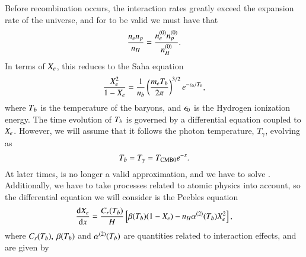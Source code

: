 Before recombination occurs, the interaction rates greatly exceed the expansion rate of the universe, and for  to be valid we must have that 
\begin{equation} \label{eq:M2:theory:Boltzmann_equation_recombination_approximation}
    \frac{n_e n_p}{n_H} = \frac{\equilibriumn[e]\equilibriumn[p]}{\equilibriumn[H]}.
\end{equation}
In terms of $\Xe$, this reduces to the Saha equation 
\begin{equation} \label{eq:M2:theory:saha_equation}
    \frac{\Xe^2}{1-\Xe} = \frac{1}{n_b} \pclosed{\frac{m_e \Tb}{2\pi}}^{3/2} e^{-\epsn / \Tb},
\end{equation}
where $\Tb$ is the temperature of the baryons, and $\epsn$ is the Hydrogen ionization energy. The time evolution of $\Tb$ is governed by a differential equation coupled to $\Xe$. However, we will assume that it follows the photon temperature, $T_\gamma$, evolving as  
\begin{equation} \label{eq:M2:theory:baryon_temperature_evolution}
    \Tb = T_\gamma = \tcmb e^{-x}.
\end{equation}
At later times,  is no longer a valid approximation, and we have to solve . Additionally, we have to take processes related to atomic physics into account, so the differential equation we will consider is the Peebles equation  
\begin{equation} \label{eq:M2:theory:Xe_peebles_ODE}
    \dv{\Xe}{x} = \frac{C_r(\Tb)}{H}\bclosed{\beta(\Tb)(1-\Xe) - n_H \alpha^{(2)}(\Tb) \Xe^2 },
\end{equation}
where $C_r(\Tb),\: \beta(\Tb)$ and $\alpha^{(2)}(\Tb)$ are quantities related to interaction effects, and are given by 
